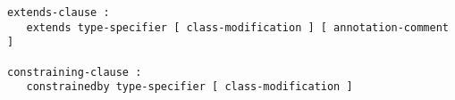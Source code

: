 \begin{lstlisting}[language=grammar]
extends-clause :
   extends type-specifier [ class-modification ] [ annotation-comment ]

constraining-clause :
   constrainedby type-specifier [ class-modification ]
\end{lstlisting}
